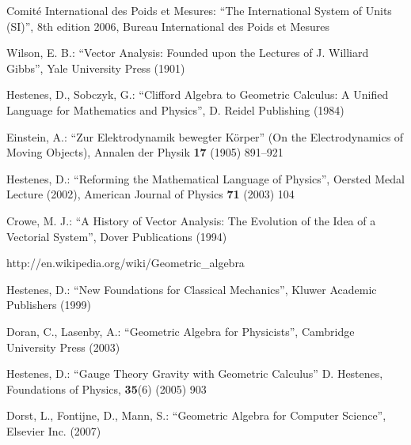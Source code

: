 \documentclass{llncs}
\begin{document}
\begin{thebibliography}{1}

Comit\'{e} International des Poids et Mesures:
``The International System of Units (SI)'',
8th edition 2006,
Bureau International des Poids et Mesures

Wilson, E. B.:
``Vector Analysis: Founded upon the Lectures of J. Williard Gibbs'',
Yale University Press (1901)

Hestenes, D., Sobczyk, G.:
``Clifford Algebra to Geometric Calculus: A Unified Language for Mathematics and Physics'',
D. Reidel Publishing (1984)

Einstein, A.:
``Zur Elektrodynamik bewegter K\"{o}rper'' (On the Electrodynamics of Moving Objects), 
Annalen der Physik {\bfseries 17} (1905) 891--921

Hestenes, D.:
``Reforming the Mathematical Language of Physics'',
Oersted Medal Lecture (2002),
American Journal of Physics {\bfseries 71} (2003) 104

Crowe, M. J.:
``A History of Vector Analysis: The Evolution of the Idea of a Vectorial System'',
Dover Publications (1994)

http://en.wikipedia.org/wiki/Geometric\_algebra

Hestenes, D.:
``New Foundations for Classical Mechanics'',
Kluwer Academic Publishers (1999)

Doran, C., Lasenby, A.:
``Geometric Algebra for Physicists'',
Cambridge University Press (2003)

Hestenes, D.:
``Gauge Theory Gravity with Geometric Calculus''
D. Hestenes, Foundations of Physics, {\bfseries 35}(6) (2005) 903

Dorst, L., Fontijne, D., Mann, S.:
``Geometric Algebra for Computer Science'',
Elsevier Inc. (2007)

\end{thebibliography}
\end{document}
